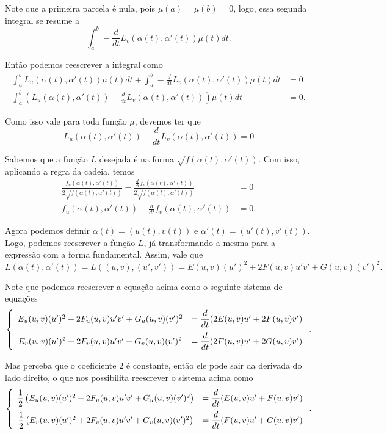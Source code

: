 \documentclass{article}
\begin{document}
Note que a primeira parcela é nula, pois $\mu(a) = \mu(b) = 0$, logo, essa segunda integral se resume a
\[\int_{a}^{b} -\frac{d}{dt}L_v(\alpha(t), \alpha'(t))\mu(t)dt.\]

Então podemos reescrever a integral como
\begin{align*}
    \int_{a}^{b} L_u(\alpha(t), \alpha'(t))\mu(t) dt + \int_{a}^{b} - \frac{d}{dt}L_v(\alpha(t), \alpha'(t))\mu(t) dt & = 0 \\
    \int_{a}^{b} \left(L_u(\alpha(t), \alpha'(t)) - \frac{d}{dt}L_v(\alpha(t), \alpha'(t))\right)\mu(t)dt & = 0.
\end{align*}

Como isso vale para toda função $\mu$, devemos ter que
\[L_u(\alpha(t), \alpha'(t)) - \frac{d}{dt}L_v(\alpha(t), \alpha'(t)) = 0\]

Sabemos que a função $L$ desejada é na forma $\sqrt{f(\alpha(t), \alpha'(t))}$. Com isso, aplicando a regra da cadeia, temos
\begin{align*}
    \frac{f_u(\alpha(t), \alpha'(t))}{2\sqrt{f(\alpha(t), \alpha'(t))}} - \frac{\frac{d}{dt}f_v(\alpha(t), \alpha'(t))}{2\sqrt{f(\alpha(t), \alpha'(t))}} & = 0 \\
    f_u(\alpha(t), \alpha'(t)) - \frac{d}{dt}f_v(\alpha(t), \alpha'(t)) & = 0.
\end{align*}

Agora podemos definir $\alpha(t) = (u(t), v(t))$ e $\alpha'(t) = (u'(t), v'(t))$. Logo, podemos reescrever a função $L$, já transformando a mesma para a expressão com a forma fundamental. Assim, vale que
\[L(\alpha(t), \alpha'(t)) = L((u, v), (u', v')) = E(u, v)(u')^2 + 2F(u, v)u'v' + G(u, v)(v')^2.\]

Note que podemos reescrever a equação acima como o seguinte sistema de equações
\begin{equation*}
    \left\{\begin{array}{cc}
        E_u(u, v)(u')^2 + 2F_u(u, v)u'v' + G_u(u, v)(v')^2 & = \dfrac{d}{dt}(2E(u, v)u' + 2F(u, v)v') \vspace{6pt}\\
        E_v(u, v)(u')^2 + 2F_v(u, v)u'v' + G_v(u, v)(v')^2 & = \dfrac{d}{dt}(2F(u, v)u' + 2G(u, v)v')
    \end{array}\right..
\end{equation*}

Mas perceba que o coeficiente $2$ é constante, então ele pode sair da derivada do lado direito, o que nos possibilita reescrever o sistema acima como
\begin{equation*}
    \left\{\begin{array}{cc}
        \dfrac{1}{2}\left(E_u(u, v)(u')^2 + 2F_u(u, v)u'v' + G_u(u, v)(v')^2\right) & = \dfrac{d}{dt}(E(u, v)u' + F(u, v)v') \vspace{6pt}\\
        \dfrac{1}{2}\left(E_v(u, v)(u')^2 + 2F_v(u, v)u'v' + G_v(u, v)(v')^2\right) & = \dfrac{d}{dt}(F(u, v)u' + G(u, v)v')
    \end{array}\right..
\end{equation*}
\end{document}
